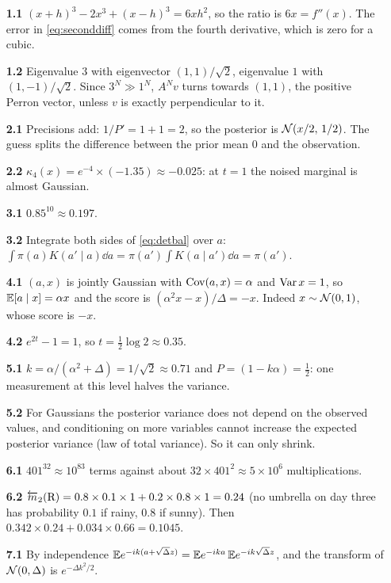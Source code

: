 \begin{itemize}[leftmargin=2.6em,labelwidth=2.2em,align=left,itemsep=0.25em]
\item[\textbf{1.1}] $(x+h)^3-2x^3+(x-h)^3=6xh^2$, so the ratio is $6x=f''(x)$. The error in \eqref{eq:seconddiff} comes from the fourth
  derivative, which is zero for a cubic.
\item[\textbf{1.2}] Eigenvalue $3$ with eigenvector $(1,1)/\sqrt2$, eigenvalue $1$ with $(1,-1)/\sqrt2$. Since $3^N\gg1^N$, $A^Nv$ turns towards
  $(1,1)$, the positive Perron vector, unless $v$ is exactly perpendicular to it.
\item[\textbf{2.1}] Precisions add: $1/P'=1+1=2$, so the posterior is $\mathcal{N}(x/2,\,1/2)$. The guess splits the difference between the
  prior mean $0$ and the observation.
\item[\textbf{2.2}] $\kappa_4(x)=e^{-4}\times(-1.35)\approx-0.025$: at $t=1$ the noised marginal is almost Gaussian.
\item[\textbf{3.1}] $0.85^{10}\approx0.197$.
\item[\textbf{3.2}] Integrate both sides of \eqref{eq:detbal} over $a$: $\int\pi(a)K(a'\mid a)\dd a=\pi(a')\int K(a\mid a')\dd a=\pi(a')$.
\item[\textbf{4.1}] $(a,x)$ is jointly Gaussian with $\operatorname{Cov}(a,x)=\alpha$ and $\operatorname{Var} x=1$, so $\mathbb{E}[a\mid x]=\alpha x$ and the score is
  $(\alpha^2x-x)/\Delta=-x$. Indeed $x\sim\mathcal{N}(0,1)$, whose score is $-x$.
\item[\textbf{4.2}] $e^{2t}-1=1$, so $t=\tfrac12\log2\approx0.35$.
\item[\textbf{5.1}] $k=\alpha/(\alpha^2+\Delta)=1/\sqrt2\approx0.71$ and $P=(1-k\alpha)=\tfrac12$: one measurement at this level halves the variance.
\item[\textbf{5.2}] For Gaussians the posterior variance does not depend on the observed values, and conditioning on more
  variables cannot increase the expected posterior variance (law of total variance). So it can only shrink.
\item[\textbf{6.1}] $401^{32}\approx10^{83}$ terms against about $32\times401^2\approx5\times10^6$ multiplications.
\item[\textbf{6.2}] $\overleftarrow{m}_2(\mathrm R)=0.8\times0.1\times1+0.2\times0.8\times1=0.24$ (no umbrella on day three has probability $0.1$ if rainy, $0.8$
  if sunny). Then $0.342\times0.24+0.034\times0.66=0.1045$.
\item[\textbf{7.1}] By independence $\mathbb{E} e^{-ik(a+\sqrt\Delta z)}=\mathbb{E} e^{-ika}\,\mathbb{E} e^{-ik\sqrt\Delta z}$, and the transform of $\mathcal{N}(0,\Delta)$ is $e^{-\Delta k^2/2}$.

\end{itemize}
